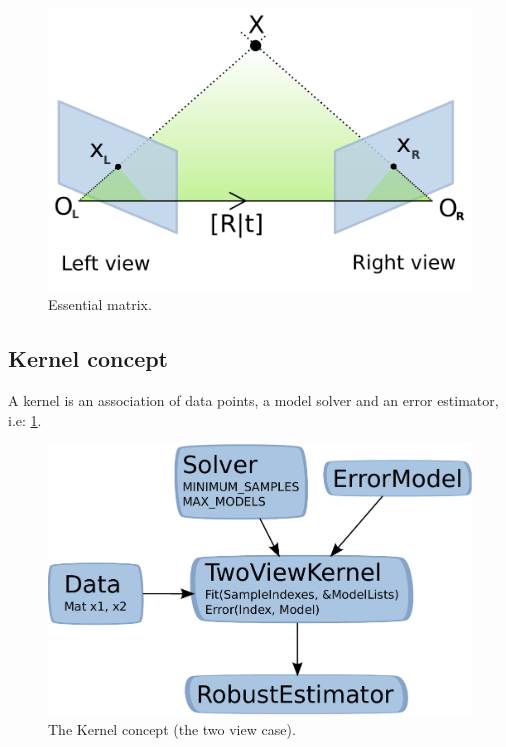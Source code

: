\documentclass[11pt, letterpaper]{report}
\begin{document}
\begin{itemize}
\begin{figure}[h!]
\begin{center}
\includegraphics[scale=.6]{figures/essential_geometry}
\caption{Essential matrix.}
\end{center}
\end{figure}

\newpage
\subsection{Kernel concept}
A kernel is an association of data points, a model solver and an error estimator, i.e: \ref{kernel_concept_fig}.
\end{itemize}

\begin{figure}[h!]
\begin{center}
\includegraphics[scale=.5]{figures/kernel_concept}
\caption{The Kernel concept (the two view case).}
\label{kernel_concept_fig}
\end{center}
\end{figure}
\end{document}
